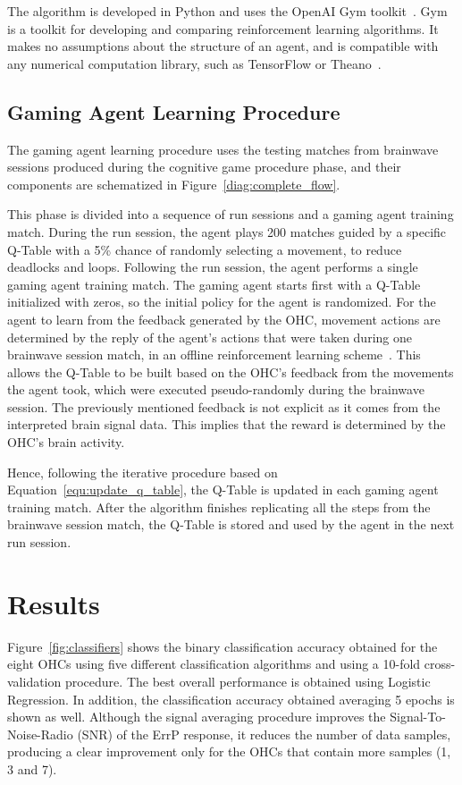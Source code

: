 \documentclass[journal]{IEEEtran}
\begin{document}
{{The algorithm is developed in Python and uses the OpenAI Gym toolkit~\cite{openai}. Gym is a toolkit for developing and comparing reinforcement learning algorithms. It makes no assumptions about the structure of an agent, and is compatible with any numerical computation library, such as TensorFlow or Theano~\cite{tensorflow2015-whitepaper}.

\subsection{Gaming Agent Learning Procedure}
\label{q_learning_step_alg}

The gaming agent learning procedure uses the testing matches from brainwave sessions produced during the cognitive game procedure phase, and their components are schematized in Figure~\ref{diag:complete_flow}.

This phase is divided into a sequence of run sessions and a gaming agent training match.  During the run session, the agent plays 200 matches guided by a specific Q-Table with a 5\% chance of randomly selecting a movement, to reduce deadlocks and loops.  Following the run session, the agent performs a single gaming agent training match.  The gaming agent starts first with a Q-Table initialized with zeros, so the initial policy for the agent is randomized.  For the agent to learn from the feedback generated by the OHC, movement actions are determined by the reply of the agent's actions that were taken during one brainwave session match, in an offline reinforcement learning scheme~\cite{Levine2020}. This allows the Q-Table to be built based on the OHC's feedback from the movements the agent took, which were executed pseudo-randomly during the brainwave session.  The previously mentioned feedback is not explicit as it comes from the interpreted brain signal data. This implies that the reward is determined by the OHC's brain activity.

Hence, following the iterative procedure based on Equation~\ref{equ:update_q_table}, the Q-Table is updated in each gaming agent training match. After the algorithm finishes replicating all the steps from the brainwave session match, the Q-Table is stored and used by the agent in the next run session.


\section{Results}
\label{results}

Figure~\ref{fig:classifiers} shows the binary classification accuracy obtained for the eight OHCs using five different classification algorithms and using a 10-fold cross-validation procedure.  The best overall performance is obtained using Logistic Regression.  In addition, the classification accuracy obtained averaging 5 epochs is shown as well.  Although the signal averaging procedure improves the Signal-To-Noise-Radio (SNR) of the ErrP response, it reduces the number of data samples, producing a clear improvement only for the OHCs that contain more samples (1, 3 and 7).

}}
\end{document}
